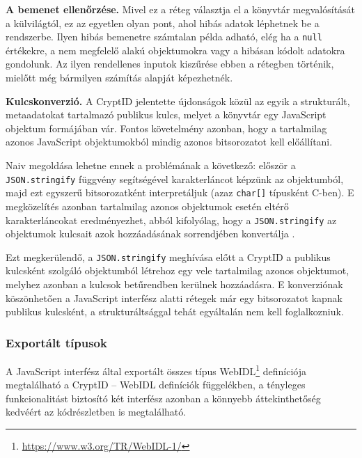 \begin{outdentlist}
    \item[]\textbf{A bemenet ellenőrzése.}
    Mivel ez a réteg választja el a könyvtár megvalósítását a külvilágtól, ez az egyetlen olyan pont, ahol hibás adatok léphetnek be a rendszerbe. Ilyen hibás bemenetre számtalan példa adható, elég ha a \texttt{null} értékekre, a nem megfelelő alakú objektumokra vagy a hibásan kódolt adatokra gondolunk. Az ilyen rendellenes inputok kiszűrése ebben a rétegben történik, mielőtt még bármilyen számítás alapját képezhetnék.

    \item[]\textbf{Kulcskonverzió.}
    A CryptID jelentette újdonságok közül az egyik a strukturált, metaadatokat tartalmazó publikus kulcs, melyet a könyvtár egy JavaScript objektum formájában vár. Fontos követelmény azonban, hogy a tartalmilag azonos JavaScript objektumokból mindig azonos bitsorozatot kell előállítani.
    
    Naiv megoldása lehetne ennek a problémának a következő: először a \texttt{JSON.stringify} függvény segítségével karakterláncot képzünk az objektumból, majd ezt egyszerű bitsorozatként interpretáljuk (azaz \texttt{char[]} típusként C-ben). E megközelítés azonban tartalmilag azonos objektumok esetén eltérő karakterláncokat eredményezhet, abból kifolyólag, hogy a \texttt{JSON.stringify} az objektumok kulcsait azok hozzáadásának sorrendjében konvertálja \cite{ECMAScript2015Specification}.
    
    Ezt megkerülendő, a \texttt{JSON.stringify} meghívása előtt a CryptID a publikus kulcsként szolgáló objektumból létrehoz egy vele tartalmilag azonos objektumot, melyhez azonban a kulcsok betűrendben kerülnek hozzáadásra. E konverziónak köszönhetően a JavaScript interfész alatti rétegek már egy bitsorozatot kapnak publikus kulcsként, a strukturáltsággal tehát egyáltalán nem kell foglalkozniuk.
\end{outdentlist}

\subsubsection{Exportált típusok}

A JavaScript interfész által exportált összes típus WebIDL\footnote{\url{https://www.w3.org/TR/WebIDL-1/}} definíciója megtalálható a CryptID – WebIDL definíciók függelékben,
a tényleges funkcionalitást biztosító két interfész azonban a könnyebb áttekinthetőség kedvéért az  kódrészletben is megtalálható.

